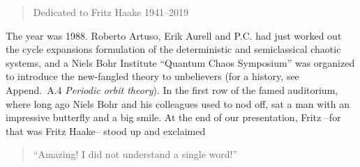 
\begin{quote}
     Dedicated to Fritz Haake 1941--2019
\end{quote}



The year was 1988.
Roberto Artuso, Erik Aurell and P.C. had just worked out the cycle
expansions formulation of the deterministic and semiclassical chaotic
systems, and a Niels Bohr Institute ``Quantum Chaos
Symposium'' was organized to introduce the new-fangled theory to
unbelievers (for a history, see  {Append.~A.4
{\em Periodic orbit theory}}).
In the first row of the famed auditorium, where long ago Niels Bohr and
his colleagues used to nod off, sat a man with an impressive butterfly
and a big smile. At the end of our presentation, Fritz --for that was
Fritz Haake-- stood up and exclaimed

\begin{quote}
     ``Amazing! I did not understand a single word!''
\end{quote}

